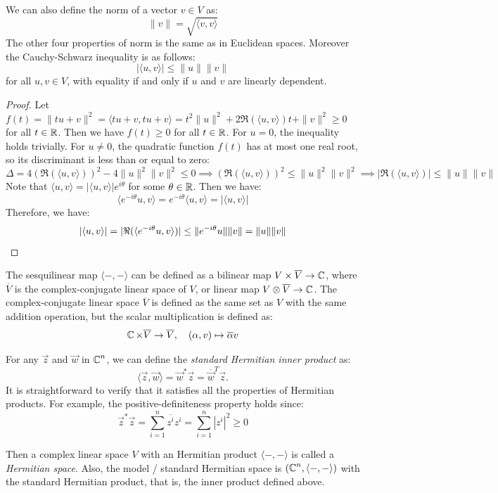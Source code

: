 We can also define the norm of a vector $v \in V$ as:
\[
	\| v \| = \sqrt{\langle v, v \rangle}
\]
The other four properties of norm is the same as in Euclidean spaces. Moreover the Cauchy-Schwarz inequality is as follows:
\[
	|\langle u, v \rangle| \leq \| u \| \| v \|
\]
for all $u, v \in V$, with equality if and only if $u$ and $v$ are linearly dependent.
\begin{proof}
	Let $f(t) = \| tu + v \|^2 = \langle tu + v, tu + v \rangle = t^2 \| u \|^2 + 2 \Re(\langle u, v \rangle) t + \| v \|^2 \geq 0$ for all $t \in \operatorname{\mathbb{R}}$. Then we have $f(t) \geq 0$ for all $t \in \operatorname{\mathbb{R}}$. For $u = 0$, the inequality holds trivially. For $u \neq 0$, the quadratic function $f(t)$ has at most one real root, so its discriminant is less than or equal to zero:
	\[
		\Delta = 4 {(\Re(\langle u, v \rangle))}^2 - 4 \| u \|^2 \| v \|^2 \leq 0 \implies {(\Re(\langle u, v \rangle))}^2 \leq \| u \|^2 \| v \|^2 \implies | \Re (\langle u, v \rangle) | \leq \| u \| \| v \|
	\]
	Note that $\langle u, v \rangle = |\langle u, v \rangle| e^{i \theta}$ for some $\theta \in \operatorname{\mathbb{R}}$. Then we have:
	\[
		\langle e^{-i \theta} u, v \rangle = e^{-i \theta} \langle u, v \rangle = |\langle u, v \rangle|
	\]
	Therefore, we have:
	\[
		|\langle u, v \rangle| = | \Re (\langle e^{-i \theta} u, v \rangle) | \leq \| e^{-i \theta} u \| \| v \| = \| u \| \| v \| \qedhere
	\]
\end{proof}

The sesquilinear map $\langle -, - \rangle$ can be defined as a bilinear map $V \times \overline{V} \to \operatorname{\mathbb{C}}$, where $\overline{V}$ is the complex-conjugate linear space of $V$, or linear map $V \otimes \overline{V} \to \operatorname{\mathbb{C}}$. The complex-conjugate linear space $\overline{V}$ is defined as the same set as $V$ with the same addition operation, but the scalar multiplication is defined as:
\[
	\operatorname{\mathbb{C}} \times \overline{V} \to \overline{V}, \quad (\alpha, v) \mapsto \overline{\alpha} v
\]

\begin{example}
	For any $\vec{z}$ and $\vec{w}$ in $\operatorname{\mathbb{C}}^n$, we can define the \emph{standard Hermitian inner product} as:
	\[
		\langle \vec{z}, \vec{w} \rangle = \vec{w}^* \vec{z} = \overline{\vec{w}}^T \vec{z}.
	\]
	It is straightforward to verify that it satisfies all the properties of Hermitian products. For example, the positive-definiteness property holds since:
	\[
		\vec{z}^* \vec{z} = \sum_{i = 1}^n \overline{z^i} z^i = \sum_{i = 1}^n |z^i|^2 \geq 0
	\]
\end{example}

Then a complex linear space $V$ with an Hermitian product $\langle -, - \rangle$ is called a \emph{Hermitian space}. Also, the model / standard Hermitian space is $(\operatorname{\mathbb{C}}^n, \langle -, - \rangle)$ with the standard Hermitian product, that is, the inner product defined above.

